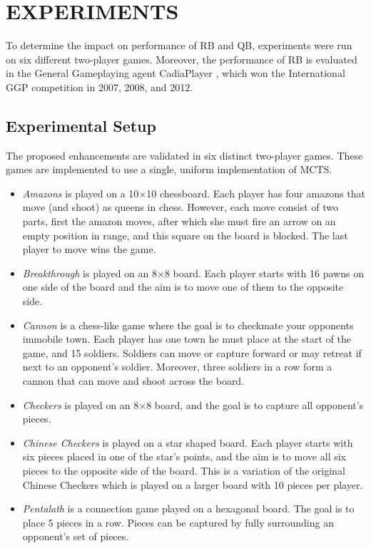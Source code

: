 \documentclass{ecai2014}
\begin{document}
\section{EXPERIMENTS}
\label{sec:experiments}
To determine the impact on performance of RB and QB, experiments were run on six different two-player games. Moreover, the performance of RB is evaluated in the General Gameplaying agent {\sc CadiaPlayer} \cite{bjornsson2009cadiaplayer}, which won the International GGP competition in 2007, 2008, and 2012.

\subsection{Experimental Setup}
\label{subsec:expsetup}
The proposed enhancements are validated in six distinct two-player games. These games are implemented to use a single, uniform implementation of MCTS.
\begin{itemize}
\item \emph{Amazons} is played on a 10$\times$10 chessboard. Each player has four amazons that move (and shoot) as queens in chess. However, each move consist of two parts, first the amazon moves, after which she must fire an arrow on an empty position in range, and this square on the board is blocked. The last player to move wins the game.
\item \emph{Breakthrough} is played on an 8$\times$8 board. Each player starts with 16 pawns on one side of the board and the aim is to move one of them to the opposite side.
\item \emph{Cannon} is a chess-like game where the goal is to checkmate your opponents immobile town. Each player has one town he must place at the start of the game, and 15 soldiers. Soldiers can move or capture forward or may retreat if next to an opponent's soldier. Moreover, three soldiers in a row form a cannon that can move and shoot across the board.
\item \emph{Checkers} is played on an 8$\times$8 board, and the goal is to capture all opponent's pieces.
\item \emph{Chinese Checkers} is played on a star shaped board. Each player starts with six pieces placed in one of the star's points, and the aim is to move all six pieces to the opposite side of the board. This is a variation of the original Chinese Checkers which is played on a larger board with 10 pieces per player.
\item \emph{Pentalath} is a connection game played on a hexagonal board. The goal is to place 5 pieces in a row. Pieces can be captured by fully surrounding an opponent's set of pieces.
\end{itemize}
\end{document}
